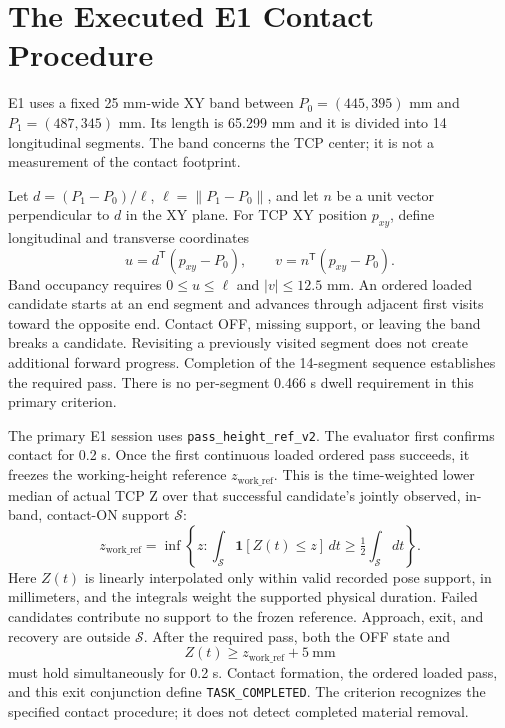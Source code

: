 \section{The Executed E1 Contact Procedure}
E1 uses a fixed 25 mm-wide XY band between \(P_0=(445,395)\) mm and \(P_1=(487,345)\) mm. Its length is 65.299 mm and it is divided into 14 longitudinal segments. The band concerns the TCP center; it is not a measurement of the contact footprint.

Let \(d=(P_1-P_0)/\ell\), \(\ell=\|P_1-P_0\|\), and let \(n\) be a unit vector perpendicular to \(d\) in the XY plane. For TCP XY position \(p_{xy}\), define longitudinal and transverse coordinates
\begin{equation}
 u=d^\mathsf{T}(p_{xy}-P_0),\qquad
 v=n^\mathsf{T}(p_{xy}-P_0).
 \label{eq:task_band}
\end{equation}
Band occupancy requires \(0\leq u\leq\ell\) and \(|v|\leq12.5\) mm. An ordered loaded candidate starts at an end segment and advances through adjacent first visits toward the opposite end. Contact OFF, missing support, or leaving the band breaks a candidate. Revisiting a previously visited segment does not create additional forward progress. Completion of the 14-segment sequence establishes the required pass. There is no per-segment 0.466 s dwell requirement in this primary criterion.

The primary E1 session uses \texttt{pass\_height\_ref\_v2}. The evaluator first confirms contact for 0.2 s. Once the first continuous loaded ordered pass succeeds, it freezes the working-height reference \(z_{\mathrm{work\_ref}}\). This is the time-weighted lower median of actual TCP Z over that successful candidate's jointly observed, in-band, contact-ON support \(\mathcal S\):
\begin{equation}
 z_{\mathrm{work\_ref}}=\inf\left\{z:
 \int_{\mathcal S}\mathbf{1}[Z(t)\leq z]\,dt
 \geq \tfrac12\int_{\mathcal S}dt\right\}.
 \label{eq:working_height_reference}
\end{equation}
Here \(Z(t)\) is linearly interpolated only within valid recorded pose support, in millimeters, and the integrals weight the supported physical duration. Failed candidates contribute no support to the frozen reference. Approach, exit, and recovery are outside \(\mathcal S\). After the required pass, both the OFF state and
\begin{equation}
 Z(t)\geq z_{\mathrm{work\_ref}}+5\ \mathrm{mm}
 \label{eq:pass_height_release}
\end{equation}
must hold simultaneously for 0.2 s. Contact formation, the ordered loaded pass, and this exit conjunction define \texttt{TASK\_COMPLETED}. The criterion recognizes the specified contact procedure; it does not detect completed material removal.

